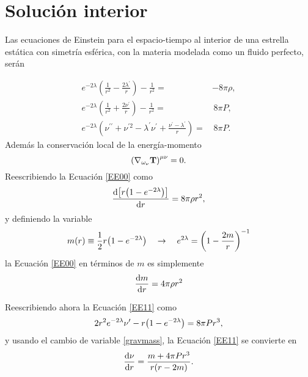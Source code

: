 \section{Solución interior}
\noindent Las ecuaciones de Einstein para el espacio-tiempo al interior de una estrella estática con simetría esférica, con la materia modelada como un fluido perfecto, serán

\begin{align}
     e ^ { - 2 \lambda } \left( \frac { 1 } { r ^ { 2 } } - \frac { 2 \lambda ^ { \prime } } { r } \right) - \frac { 1 } { r ^ { 2 } } =&  -8\pi\rho, \label{EE00} \\
    e ^ { - 2 \lambda } \left( \frac { 1 } { r ^ { 2 } } + \frac { 2 \nu ^ { \prime } } { r } \right) - \frac { 1 } { r ^ { 2 } } =& \, 8\pi P, \label{EE11}\\
    e ^ { - 2 \lambda } \left( \nu ^ { \prime \prime } + \nu ^ { \prime 2 } - \lambda ^ { \prime } \nu ^ { \prime } + \frac { \nu ^ { \prime } - \lambda ^ { \prime } } { r } \right) =& \, 8\pi P. \label{EE22}
\end{align}
Además la conservación local de la energía-momento
\begin{equation}
    \qty(\nabla_{\omega_\nu}\mathbf{T})^{\mu \nu} = 0 \label{CEM1}.
\end{equation}
Reescribiendo la Ecuación \eqref{EE00} como
\begin{equation*}
    \dv{\qty[r\qty(1-e^{-2\lambda})]}{r}=8\pi\rho r^2,
\end{equation*}
y definiendo la variable
\begin{equation}
    m(r) \equiv \frac{1}{2}r\qty(1-e^{-2\lambda}) \quad \rightarrow \quad e^{2\lambda} = \qty(1-\frac{2m}{r})^{-1} \label{gravmass} 
\end{equation}
la Ecuación \eqref{EE00} en términos de $m$ es simplemente
\begin{equation}
    \dv{m}{r} = 4\pi \rho r^2
\end{equation}

Reescribiendo ahora la Ecuación \eqref{EE11} como
\begin{equation*}
    2 r^2 e^{-2\lambda} \nu^{\prime} - r\qty(1- e^{-2\lambda}) = 8\pi P r^3,
\end{equation*}
y usando el cambio de variable \eqref{gravmass}, la Ecuación \eqref{EE11} se convierte en 
\begin{equation}
    \dv{\nu}{r}= \frac{m+4\pi P r^3}{r\qty(r-2m)}.\label{dnutovv}
\end{equation}

